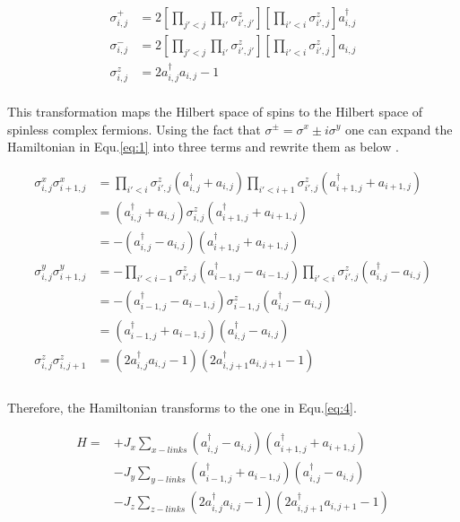 \documentclass{article}
\begin{document}
\begin{equation}\label{eq:2}
	\begin{aligned}
		\sigma^{+}_{i,j} &= 2[\prod_{j'<j}\prod_{i'}\sigma^{z}_{i',j'}][\prod_{i'<i}\sigma^z_{i',j}] a^{\dagger}_{i,j}\\
		\sigma^{-}_{i,j} &= 2[\prod_{j'<j}\prod_{i'}\sigma^{z}_{i',j'}][\prod_{i'<i}\sigma^z_{i',j}] a_{i,j}\\
		\sigma^{z}_{i,j} &= 2a^{\dagger}_{i,j}a_{i,j} - 1
	\end{aligned}
\end{equation}\\

\noindent This transformation maps the Hilbert space of spins to the Hilbert space of spinless complex fermions. Using the fact that $ \sigma^{\pm} = \sigma^{x}\pm i\sigma^{y} $ one can expand the Hamiltonian in Equ.\hspace{0.2mm}\ref{eq:1} into three terms and rewrite them as below \cite{Schmoll_2017}.


\begin{equation}\label{eq:3}
	\begin{aligned}
		\sigma^{x}_{i,j}\sigma^{x}_{i+1,j} &= \prod_{i'<i}\sigma^z_{i',j} (a^{\dagger}_{i,j} + a_{i,j}) \prod_{i'<i+1}\sigma^z_{i',j} (a^{\dagger}_{i+1,j} + a_{i+1,j})\\
		&= (a^{\dagger}_{i,j} + a_{i,j}) \sigma^z_{i,j} (a^{\dagger}_{i+1,j} + a_{i+1,j})\\
		&= -(a^{\dagger}_{i,j} - a_{i,j}) (a^{\dagger}_{i+1,j} + a_{i+1,j})\\
		\sigma^{y}_{i,j}\sigma^{y}_{i+1,j} &= -\prod_{i'<i-1}\sigma^z_{i',j} (a^{\dagger}_{i-1,j} - a_{i-1,j}) \prod_{i'<i}\sigma^z_{i',j} (a^{\dagger}_{i,j} - a_{i,j})\\
		&= -(a^{\dagger}_{i-1,j} - a_{i-1,j}) \sigma^z_{i-1,j} (a^{\dagger}_{i,j} - a_{i,j})\\
		&= (a^{\dagger}_{i-1,j} + a_{i-1,j}) (a^{\dagger}_{i,j} - a_{i,j})\\
		\sigma^{z}_{i,j}\sigma^{z}_{i,j+1} &=  (2a^{\dagger}_{i,j}a_{i,j} - 1) (2a^{\dagger}_{i,j+1}a_{i,j+1} - 1)\\
	\end{aligned}
\end{equation}\\

\noindent Therefore, the Hamiltonian transforms to the one in Equ.\hspace{0.2mm}\ref{eq:4}. 

\begin{equation}\label{eq:4}
	\begin{aligned}
		H= &+J_x \sum_{x-links} (a^{\dagger}_{i,j} - a_{i,j}) (a^{\dagger}_{i+1,j} + a_{i+1,j})\\
		&-J_y \sum_{y-links} (a^{\dagger}_{i-1,j} + a_{i-1,j}) (a^{\dagger}_{i,j} - a_{i,j})\\
		&-J_z \sum_{z-links} (2a^{\dagger}_{i,j}a_{i,j} - 1) (2a^{\dagger}_{i,j+1}a_{i,j+1} - 1)\\
	\end{aligned}
\end{equation}\\
\end{document}
